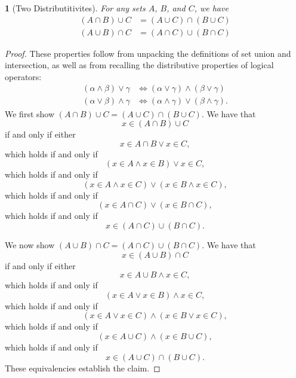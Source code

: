 \documentclass{book}
\newtheorem{majorEx}{}[section]
\begin{document}
            \begin{majorEx}[Two Distributitivites]%
            For any sets $A$, $B$, and $C$, we have
            \begin{align*}
				(A \cap B) \cup C &= (A \cup C) \cap (B \cup C) \\
				(A \cup B) \cap C &= (A \cap C) \cup (B \cap C)
			\end{align*}
			\end{majorEx}
            \begin{proof}
            These properties follow from unpacking the definitions of set union and intersection, as well as from recalling the distributive properties of logical operators:
            \begin{align*}
            	(\alpha \land \beta) \lor \gamma &\iff (\alpha \lor \gamma) \land (\beta \lor \gamma) \\
            	(\alpha \lor \beta) \land \gamma &\iff (\alpha \land \gamma) \lor (\beta \land \gamma).
			\end{align*}
			We first show  $(A \cap B) \cup C = (A \cup C) \cap (B \cup C)$. We have that
            \[
            x \in (A \cap B) \cup C
            \]
            if and only if either 
            \[
            x \in A \cap B \lor x \in C,
            \] 
            which holds if and only if
            \[
            (x \in A \land x \in B) \lor x \in C,
            \]
			which holds if and only if 
            \[
           	(x \in A \land x \in C) \lor (x \in B \land x \in C), 
            \]
            which holds if and only if
            \[
            (x \in A \cap C) \lor (x \in B \cap C),
            \]
            which holds if and only if
            \[
            x \in (A \cap C) \cup (B \cap C).
            \]
            
            We now show  $(A \cup B) \cap C = (A \cap C) \cup (B \cap C)$. We have that
            \[
            x \in (A \cup B) \cap C
            \]
            if and only if either 
            \[
            x \in A \cup B \land x \in C,
            \] 
            which holds if and only if
            \[
            (x \in A \lor x \in B) \land x \in C,
            \]
			which holds if and only if 
            \[
           	(x \in A \lor x \in C) \land (x \in B \lor x \in C), 
            \]
            which holds if and only if
            \[
            (x \in A \cup C) \land (x \in B \cup C),
            \]
            which holds if and only if
            \[
            x \in (A \cup C) \cap (B \cup C).
            \]
            These equivalencies establish the claim.
			\end{proof}
            
\end{document}
